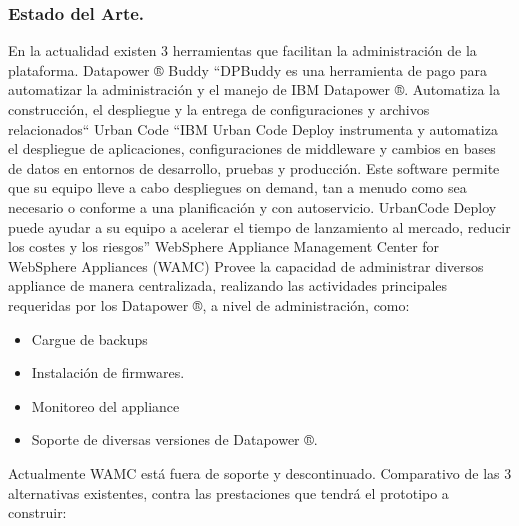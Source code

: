 \subsubsection{Estado del Arte.}
En la actualidad existen 3 herramientas que facilitan la administración de la plataforma.
\newline
Datapower ® Buddy 
\newline
“DPBuddy es una herramienta de pago para automatizar la administración y el manejo de IBM Datapower ®. Automatiza la construcción, el despliegue y la entrega de configuraciones y archivos relacionados“ 
\newline
Urban Code
\newline
“IBM Urban Code Deploy instrumenta y automatiza el despliegue de aplicaciones, configuraciones de middleware y cambios en bases de datos en entornos de desarrollo, pruebas y producción. Este software permite que su equipo lleve a cabo despliegues on demand, tan a menudo como sea necesario o conforme a una planificación y con autoservicio. UrbanCode Deploy puede ayudar a su equipo a acelerar el tiempo de lanzamiento al mercado, reducir los costes y los riesgos” %
\newline
WebSphere Appliance Management Center for WebSphere Appliances (WAMC)
\newline
Provee la capacidad de administrar diversos appliance de manera centralizada, realizando las actividades principales requeridas por los Datapower ®, a nivel de administración, como:
\begin{itemize}
    \item Cargue de backups
    \item Instalación de firmwares.
    \item Monitoreo del appliance
    \item Soporte de diversas versiones de Datapower ®.
\end{itemize}
Actualmente WAMC está fuera de soporte y descontinuado.
Comparativo de las 3 alternativas existentes, contra las prestaciones que tendrá el prototipo a construir:
\newline



\newpage